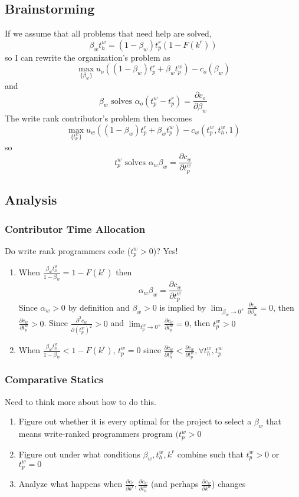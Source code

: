 \documentclass[12pt,notitlepage]{article}
\begin{document}
\subsection{Brainstorming}
If we assume that all problems that need help are solved, $$\beta_w t_h^w = (1-\beta_w) t_p^r (1-F(k^r))$$ so I can rewrite the organization's problem as 
$$\max_{\{\beta_w\}} u_o\left((1-\beta_w) t_p^r + \beta_w t_p^w\right) - c_o(\beta_w)$$ 
and $$\beta_w \text{ solves } \alpha_o (t_p^w - t_p^r) = \frac{\partial c_o}{\partial \beta_w}$$
The write rank contributor's problem then becomes
$$\max_{\{t_p^w\}} u_w\left((1-\beta_w) t_p^r + \beta_w t_p^w\right) - c_w(t_p^w, t_h^w, 1)$$
so $$t_p^w \text{ solves } \alpha_w \beta_w = \frac{\partial c_w}{\partial t_p^w}$$

\subsection{Analysis}
\subsubsection{Contributor Time Allocation}
Do write rank programmers code ($t_p^w>0$)? Yes!
\begin{enumerate}
    \item When $\frac{\beta_w t_h^w}{1-\beta_w} = 1-F(k^r)$ then
    $$\alpha_w \beta_w = \frac{\partial c_w}{\partial t_p^w}$$
    Since $\alpha_w>0$ by definition and $\beta_w>0$ is implied by $\lim_{\beta_w \to 0^+} \frac{\partial c_o}{\partial \beta_w} = 0$, then $\frac{\partial c_w}{\partial t_p^w}>0$. Since $\frac{\partial^2 c_w}{\partial (t_p^w)^2}>0$ and $\lim_{t_p^w \to 0^+} \frac{\partial c_w}{\partial t_p^w} = 0$, then $t_p^w>0$
    \item When $\frac{\beta_w t_h^w}{1-\beta_w} < 1-F(k^r)$, $t_p^w = 0$ since $\frac{\partial c_w}{\partial t_h^w} < \frac{\partial c_w}{\partial t_p^w}, \forall t_h^w, t_p^w$
\end{enumerate}
\subsubsection{Comparative Statics}
    Need to think more about how to do this.
    \begin{enumerate}
        \item Figure out whether it is every optimal for the project to select a $\beta_w$ that means write-ranked programmers program $(t_p^w > 0$
        \item Figure out under what conditions $\beta_w, t_h^w, k^r$ combine such that $t_p^w > 0$ or $t_p^w = 0$
        \item Analyze what happens when $\frac{\partial c_r}{\partial k^r}, \frac{\partial c_w}{\partial t_h^w}$ (and perhaps $\frac{\partial c_w}{\partial k^w}$) changes
        
    \end{enumerate}
    
\end{document}
